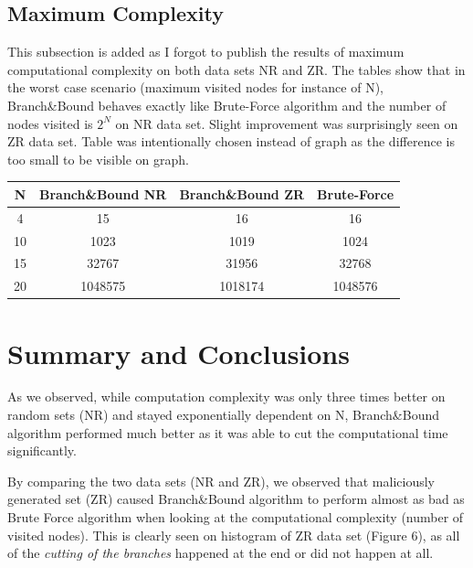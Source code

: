 \documentclass{article}
\begin{document}
\subsection{Maximum Complexity}
This subsection is added as I forgot to publish the results of maximum computational complexity on both data sets NR and ZR. The tables show that in the worst case scenario (maximum visited nodes for instance of N), Branch\&Bound behaves exactly like Brute-Force algorithm and the number of nodes visited is $2^N$ on NR data set. Slight improvement was surprisingly seen on ZR data set. Table was intentionally chosen instead of graph as the difference is too small to be visible on graph.
\begin{center}
 \begin{tabular}{||c c c c||} 
 \hline
 N & Branch\&Bound NR & Branch\&Bound ZR & Brute-Force \\ [0.5ex] 
 \hline\hline
 4 & 15 & 16 & 16 \\ 
 \hline
 10 & 1023 & 1019 & 1024 \\
 \hline
 15 & 32767 & 31956 & 32768 \\
 \hline
 20 & 1048575 & 1018174 & 1048576 \\
 \hline \hline
\end{tabular}
\end{center}

\section{Summary and Conclusions}
As we observed, while computation complexity was only three times better on random sets (NR) and stayed exponentially dependent on N, Branch\&Bound algorithm performed much better as it was able to cut the computational time significantly.

By comparing the two data sets (NR and ZR), we observed that maliciously generated set (ZR) caused Branch\&Bound algorithm to perform almost as bad as Brute Force algorithm when looking at the computational complexity (number of visited nodes). This is clearly seen on histogram of ZR data set (Figure 6), as all of the \textit{cutting of the branches} happened at the end or did not happen at all. 

\printbibliography
\end{document}
